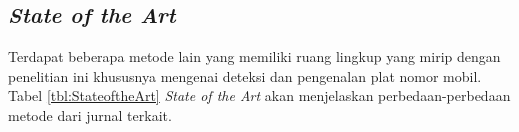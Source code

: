 \subsection{\textit{State of the Art}}
\noindent Terdapat beberapa metode lain yang memiliki ruang lingkup yang mirip dengan penelitian ini khususnya mengenai deteksi dan pengenalan plat nomor mobil. Tabel \ref{tbl:StateoftheArt} \textit{State of the Art} akan menjelaskan perbedaan-perbedaan metode dari jurnal terkait.\\
\\
\\
\\
\\
\\
\\
\\
\\
\begingroup
\setlength{\LTleft}{-20cm plus -1fill}
\setlength{\LTright}{\LTleft}
